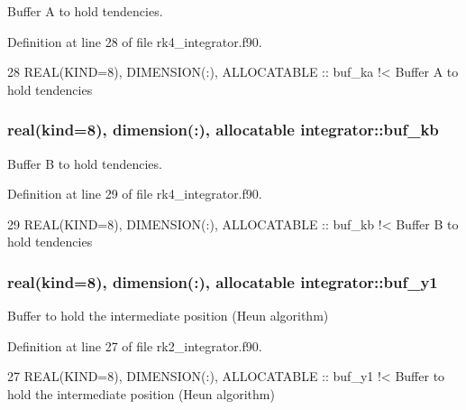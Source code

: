 Buffer A to hold tendencies. 



Definition at line 28 of file rk4\+\_\+integrator.\+f90.


\begin{DoxyCode}
28   \textcolor{keywordtype}{REAL(KIND=8)}, \textcolor{keywordtype}{DIMENSION(:)}, \textcolor{keywordtype}{ALLOCATABLE} :: buf\_ka\textcolor{comment}{ !< Buffer A to hold tendencies}
\end{DoxyCode}
\subsubsection[{\texorpdfstring{buf\+\_\+kb}{buf_kb}}]{\setlength{\rightskip}{0pt plus 5cm}real(kind=8), dimension(\+:), allocatable integrator\+::buf\+\_\+kb\hspace{0.3cm}{\ttfamily [private]}}\hypertarget{namespaceintegrator_a6d3aa6db72a39f4bc0999ef8056ffba2}{}\label{namespaceintegrator_a6d3aa6db72a39f4bc0999ef8056ffba2}


Buffer B to hold tendencies. 



Definition at line 29 of file rk4\+\_\+integrator.\+f90.


\begin{DoxyCode}
29   \textcolor{keywordtype}{REAL(KIND=8)}, \textcolor{keywordtype}{DIMENSION(:)}, \textcolor{keywordtype}{ALLOCATABLE} :: buf\_kb\textcolor{comment}{ !< Buffer B to hold tendencies}
\end{DoxyCode}
\subsubsection[{\texorpdfstring{buf\+\_\+y1}{buf_y1}}]{\setlength{\rightskip}{0pt plus 5cm}real(kind=8), dimension(\+:), allocatable integrator\+::buf\+\_\+y1\hspace{0.3cm}{\ttfamily [private]}}\hypertarget{namespaceintegrator_ad82fcb5f12f76e9009ccd172f2ffa6b0}{}\label{namespaceintegrator_ad82fcb5f12f76e9009ccd172f2ffa6b0}


Buffer to hold the intermediate position (Heun algorithm) 



Definition at line 27 of file rk2\+\_\+integrator.\+f90.


\begin{DoxyCode}
27   \textcolor{keywordtype}{REAL(KIND=8)}, \textcolor{keywordtype}{DIMENSION(:)}, \textcolor{keywordtype}{ALLOCATABLE} :: buf\_y1\textcolor{comment}{ !< Buffer to hold the intermediate position (Heun
       algorithm)}
\end{DoxyCode}
